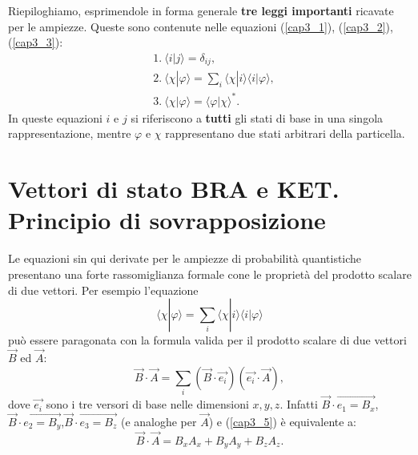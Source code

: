 \documentclass[a4paper,12pt,oneside]{book}
\begin{document}
Riepiloghiamo, esprimendole in forma generale \textbf{tre leggi importanti} ricavate per le ampiezze.
Queste sono contenute nelle equazioni (\ref{cap3_1}), (\ref{cap3_2}), (\ref{cap3_3}):
	\begin{equation}
		\boxed{\boxed{
			\begin{aligned}
				&\textrm{1.}\ \langle i | j \rangle=\delta_{ij},\\
				&\textrm{2.}\ \langle \chi | \varphi \rangle=\sum \limits_{i} \langle \chi | i \rangle \langle i | \varphi \rangle,\\
				&\textrm{3.}\ \langle \chi | \varphi \rangle = \langle \varphi | \chi \rangle ^* .
			\end{aligned}
			}}
	\end{equation}
In queste equazioni $i$ e $j$ si riferiscono a \textbf{tutti} gli stati di base in una singola rappresentazione, mentre $\varphi$ e $\chi$ rappresentano due stati arbitrari della particella.

\section[Principio di sovrapposizione]{Vettori di stato BRA e KET. Principio di sovrapposizione} 

Le equazioni sin qui derivate per le ampiezze di probabilità quantistiche presentano una forte rassomiglianza formale cone le proprietà del prodotto scalare di due vettori. Per esempio l'equazione
	\begin{equation}
		\langle \chi | \varphi \rangle =\sum \limits_{i}\langle \chi | i \rangle \langle i | \varphi \rangle
	\label{cap3_4}
	\end{equation}
può essere paragonata con la formula valida per il prodotto scalare di due vettori $\vec{B}$ ed $\vec{A}$:
	\begin{equation}
		\vec{B} \cdot \vec{A}= \sum \limits_{i} (\vec{B} \cdot  \vec{e_i})(\vec{e_i} \cdot \vec{A}) ,
	\label{cap3_5}
	\end{equation}
dove $\vec{e_i}$ sono i tre versori di base nelle dimensioni $x,y,z$. Infatti $\vec{B}\cdot \vec{e_1=B_x}$, $\vec{B}\cdot \vec{e_2=B_y}$,$\vec{B}\cdot \vec{e_3=B_z}$ (e analoghe per  $\vec{A}$) e (\eqref{cap3_5}) è equivalente a:
	\begin{equation}
		\vec{B} \cdot \vec{A} = B_xA_x+B_yA_y+B_zA_z .
	\end{equation}
	
\end{document}
